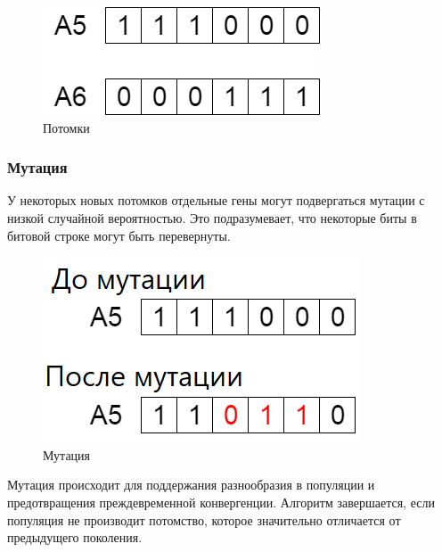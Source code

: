 \begin{figure}[H]
  \centering
  \includegraphics[width=0.5\linewidth]{./img/child}
  \caption{Потомки}
  \label{fig:mpr}
\end{figure}

\subsubsection{Мутация}
У некоторых новых потомков отдельные  гены могут подвергаться мутации с низкой случайной вероятностью. Это подразумевает, что некоторые биты в битовой строке могут быть перевернуты.

\begin{figure}[H]
  \centering
  \includegraphics[width=0.5\linewidth]{./img/mutation}
  \caption{Мутация}
  \label{fig:mpr}
\end{figure}

Мутация происходит для поддержания разнообразия в популяции и предотвращения преждевременной конвергенции. Алгоритм завершается, если популяция не производит потомство, которое значительно отличается от предыдущего поколения. 